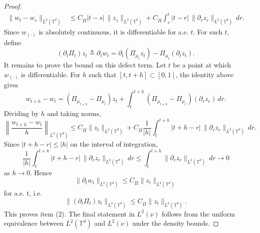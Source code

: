 \documentclass[10pt,a4paper]{amsart}
\begin{document}
\begin{proof}
\begin{align*}
\|w_t-w_s\|_{L^2(\mathbb{T}^d)}
&\le
C_{\dot\Pi}|t-s|\,\|z_s\|_{L^2(\mathbb{T}^d)}
+
C_{\dot\Pi}\int_s^t |t-r|\,\|\partial_r z_r\|_{L^2(\mathbb{T}^d)}\,dr.
\end{align*}
Since $w_{(\cdot)}$ is absolutely continuous, it is differentiable for a.e. $t$.
For such $t$, define
\[
(\partial_t\Pi_t)z_t \triangleq \partial_t w_t
=
\partial_t(\Pi_{\mu_t}z_t)-\Pi_{\mu_t}(\partial_t z_t).
\]
It remains to prove the bound on this defect term. Let $t$ be a point at which $w_{(\cdot)}$ is differentiable. For $h$ such that
$[t,t+h]\subset [0,1]$, the identity above gives
\[
w_{t+h}-w_t
=
(\Pi_{\mu_{t+h}}-\Pi_{\mu_t})z_t
+
\int_t^{t+h}(\Pi_{\mu_{t+h}}-\Pi_{\mu_r})(\partial_r z_r)\,dr.
\]
Dividing by $h$ and taking norms,
\[
\left\|\frac{w_{t+h}-w_t}{h}\right\|_{L^2(\mathbb{T}^d)}
\le
C_{\dot\Pi}\|z_t\|_{L^2(\mathbb{T}^d)}
+
C_{\dot\Pi}\frac{1}{|h|}
\int_t^{t+h}|t+h-r|\,\|\partial_r z_r\|_{L^2(\mathbb{T}^d)}\,dr.
\]
Since $|t+h-r|\le |h|$ on the interval of integration,
\[
\frac{1}{|h|}
\int_t^{t+h}|t+h-r|\,\|\partial_r z_r\|_{L^2(\mathbb{T}^d)}\,dr
\le
\int_t^{t+h}\|\partial_r z_r\|_{L^2(\mathbb{T}^d)}\,dr
\to 0
\]
as $h\to 0$. Hence
\[
\|\partial_t w_t\|_{L^2(\mathbb{T}^d)}
\le
C_{\dot\Pi}\|z_t\|_{L^2(\mathbb{T}^d)}
\]
for a.e. $t$, i.e.
\[
\|(\partial_t\Pi_t)z_t\|_{L^2(\mathbb{T}^d)}
\le
C_{\dot\Pi}\|z_t\|_{L^2(\mathbb{T}^d)}.
\]
This proves item (2). The final statement in $L^2(\nu)$ follows from the uniform equivalence between
$L^2(\mathbb{T}^d)$ and $L^2(\nu)$ under the density bounds.
\end{proof}
\end{document}
